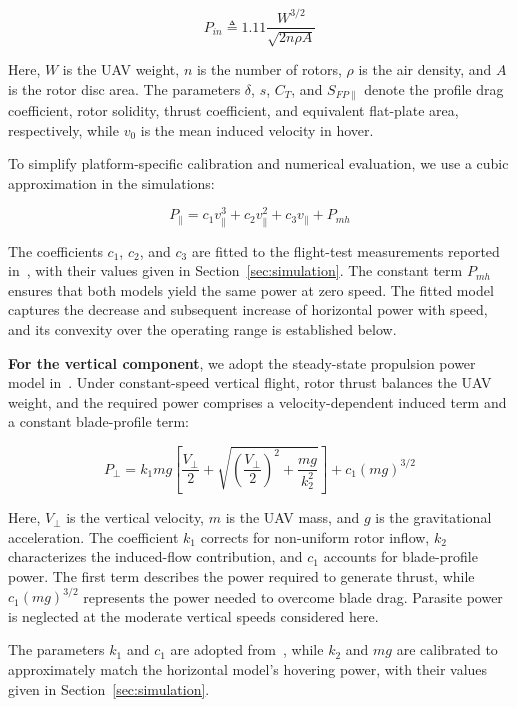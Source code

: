 $$P_{in}\triangleq 1.11 \frac{W^{3/2}}{\sqrt{2n\rho A}}$$

Here, $W$ is the UAV weight, $n$ is the number of rotors, $\rho$ is the air density, and $A$ is the rotor disc area.
The parameters $\delta$, $s$, $C_T$, and $S_{FP\parallel}$ denote the profile drag coefficient, rotor solidity, thrust coefficient, and equivalent flat-plate area, respectively, while $v_0$ is the mean induced velocity in hover.

To simplify platform-specific calibration and numerical evaluation, we use a cubic approximation in the simulations:

\begin{equation}
    P_{\parallel} = c_1 v_{\parallel}^3 + c_2 v_{\parallel}^2 + c_3 v_{\parallel} + P_{mh}\label{equ:h_2}
\end{equation}

The coefficients $c_1$, $c_2$, and $c_3$ are fitted to the flight-test measurements reported in~\cite{assume}, with their values given in Section~\ref{sec:simulation}.
The constant term $P_{mh}$ ensures that both models yield the same power at zero speed.
The fitted model captures the decrease and subsequent increase of horizontal power with speed, and its convexity over the operating range is established below.

\textbf{For the vertical component}, we adopt the steady-state propulsion power model in~\cite{PowerConsumptionModel}.
Under constant-speed vertical flight, rotor thrust balances the UAV weight, and the required power comprises a velocity-dependent induced term and a constant blade-profile term:

\begin{equation}
    P_{\perp} = k_1 mg \left[\frac{V_{\perp}}{2}+\sqrt{\left(\frac{V_{\perp}}{2}\right)^2+\frac{mg}{k_2^2}}\right] + c_1(mg)^{3/2}
    \label{equ:v_1}
\end{equation}

Here, $V_{\perp}$ is the vertical velocity, $m$ is the UAV mass, and $g$ is the gravitational acceleration.
The coefficient $k_1$ corrects for non-uniform rotor inflow, $k_2$ characterizes the induced-flow contribution, and $c_1$ accounts for blade-profile power.
The first term describes the power required to generate thrust, while $c_1(mg)^{3/2}$ represents the power needed to overcome blade drag.
Parasite power is neglected at the moderate vertical speeds considered here.

The parameters $k_1$ and $c_1$ are adopted from~\cite{PowerConsumptionModel}, while $k_2$ and $mg$ are calibrated to approximately match the horizontal model's hovering power, with their values given in Section~\ref{sec:simulation}.


